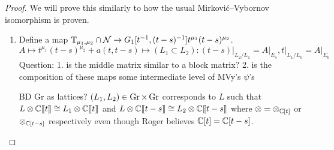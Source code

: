 \documentclass{article}
\begin{document}
\begin{proof}
We will prove this similarly to how the usual Mirkovi\'c--Vybornov isomorphism is proven.
\begin{enumerate}[label = Step \arabic*:]
    \item Define a map $\mathbb T_{\mu_1, \mu_2} \cap \mathcal N \rightarrow G_1[t^{-1}, (t-s)^{-1}] t^{\mu_1} (t-s)^{\mu_2}$.
    $$
    A \mapsto t^{\mu_1} (t-s)^{\mu_2} + a(t, t-s) \mapsto (L_1 \subset L_2) : (t-s)\big|_{L_2/L_1} = A\big|_{E_s}  , t\big|_{L_1/L_0} = A\big|_{E_0}
    $$
    Question: 1. is the middle matrix similar to a block matrix? 2. is the composition of these maps some intermediate level of MVy's $\psi$'s 

    BD Gr as lattices? $(L_1,L_2)\in\operatorname{Gr}\times\operatorname{Gr}$ corresponds to $L$ such that $L\otimes\mathbb C[\hspace{-.12em}[ {t} ]\hspace{-.12em}]\cong L_1\otimes\mathbb C[\hspace{-.12em}[ {t} ]\hspace{-.12em}]$ and $L\otimes\mathbb C[\hspace{-.12em}[ {t-s} ]\hspace{-.12em}]\cong L_2\otimes\mathbb C[\hspace{-.12em}[ {t-s} ]\hspace{-.12em}]$ where $\otimes = \otimes_{\mathbb C[t]}$ or $\otimes_{\mathbb C[t-s]}$ respectively even though Roger believes $\mathbb C[t] = \mathbb C[t-s]$.  


\end{enumerate}
\end{proof}
\end{document}
